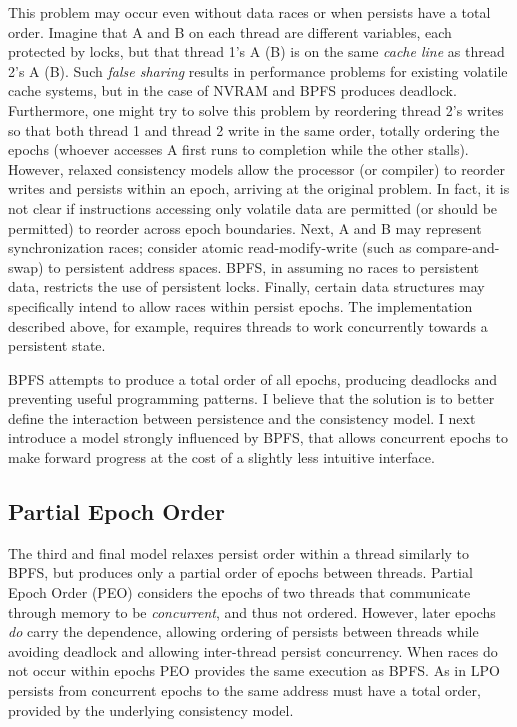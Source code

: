 This problem may occur even without data races or when persists have a total order.
Imagine that A and B on each thread are different variables, each protected by locks, but that thread 1's A (B) is on the same \emph{cache line} as thread 2's A (B).
Such \emph{false sharing} results in performance problems for existing volatile cache systems, but in the case of NVRAM and BPFS produces deadlock.
Furthermore, one might try to solve this problem by reordering thread 2's writes so that both thread 1 and thread 2 write in the same order, totally ordering the epochs (whoever accesses A first runs to completion while the other stalls).
However, relaxed consistency models allow the processor (or compiler) to reorder writes and persists within an epoch, arriving at the original problem.
In fact, it is not clear if instructions accessing only volatile data are permitted (or should be permitted) to reorder across epoch boundaries.
Next, A and B may represent synchronization races; consider atomic read-modify-write (such as compare-and-swap) to persistent address spaces.
BPFS, in assuming no races to persistent data, restricts the use of persistent locks.
Finally, certain data structures may specifically intend to allow races within persist epochs.
The \GroupCommit implementation described above, for example, requires threads to work concurrently towards a persistent state.

BPFS attempts to produce a total order of all epochs, producing deadlocks and preventing useful programming patterns.
I believe that the solution is to better define the interaction between persistence and the consistency model.
I next introduce a model strongly influenced by BPFS, that allows concurrent epochs to make forward progress at the cost of a slightly less intuitive interface.

\subsection{Partial Epoch Order}
\label{sec:PMC:PersistenceModels:PEO}

The third and final model relaxes persist order within a thread similarly to BPFS, but produces only a partial order of epochs between threads.
Partial Epoch Order (PEO) considers the epochs of two threads that communicate through memory to be \emph{concurrent}, and thus not ordered.
However, later epochs \emph{do} carry the dependence, allowing ordering of persists between threads while avoiding deadlock and allowing inter-thread persist concurrency.
When races do not occur within epochs PEO provides the same execution as BPFS.
As in LPO persists from concurrent epochs to the same address must have a total order, provided by the underlying consistency model.

